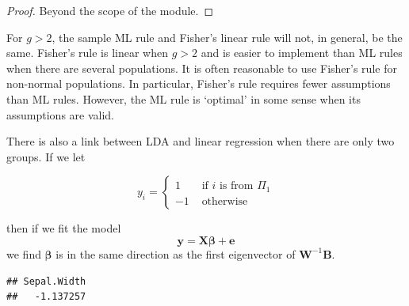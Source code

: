 \documentclass[
]{book}
\newenvironment{Shaded}{\begin{snugshade}}{\end{snugshade}}
\newcommand{\CommentTok}[1]{\textcolor[rgb]{0.56,0.35,0.01}{\textit{#1}}}
\newcommand{\DecValTok}[1]{\textcolor[rgb]{0.00,0.00,0.81}{#1}}
\newcommand{\FunctionTok}[1]{\textcolor[rgb]{0.13,0.29,0.53}{\textbf{#1}}}
\newcommand{\NormalTok}[1]{#1}
\newcommand{\OtherTok}[1]{\textcolor[rgb]{0.56,0.35,0.01}{#1}}
\newcommand{\SpecialCharTok}[1]{\textcolor[rgb]{0.81,0.36,0.00}{\textbf{#1}}}
\newcommand{\StringTok}[1]{\textcolor[rgb]{0.31,0.60,0.02}{#1}}
\theoremstyle{definition}
\theoremstyle{definition}
\theoremstyle{definition}
\theoremstyle{definition}
\theoremstyle{remark}
\begin{document}
\begin{proof}
Beyond the scope of the module.
\end{proof}

For \(g > 2\), the sample ML rule and Fisher's linear rule will not, in general, be the same. Fisher's rule is linear when \(g>2\) and is easier to implement than ML rules when there are several populations. It is often reasonable to use Fisher's rule for non-normal populations. In particular, Fisher's rule requires fewer assumptions than ML rules. However, the ML rule is `optimal' in some sense when its assumptions are valid.

There is also a link between LDA and linear regression when there are only two groups. If we let

\[
y_i = \begin{cases} 1 &\mbox{ if }i \mbox{ is from } \Pi_1\\
-1 &\mbox{ otherwise}
\end{cases}
\]

then if we fit the model
\[\mathbf y= \mathbf X\boldsymbol \beta+ \mathbf e\]
we find \(\boldsymbol \beta\) is in the same direction as the first eigenvector of \(\mathbf W^{-1}\mathbf B\).

\begin{Shaded}
\end{Shaded}

\begin{verbatim}
## Sepal.Width 
##   -1.137257
\end{verbatim}
\end{document}
